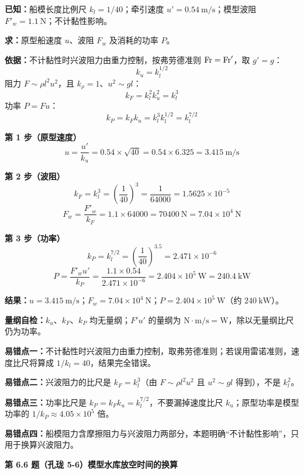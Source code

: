 \begin{jie}
\textbf{已知：}船模长度比例尺 $k_l=1/40$；牵引速度 $u'=0.54\ \mathrm{m/s}$；模型波阻 $F'_w=1.1\ \mathrm{N}$；不计黏性影响。

\textbf{求：}原型船速度 $u$、波阻 $F_w$ 及消耗的功率 $P$。

\textbf{依据：}不计黏性时兴波阻力由重力控制，按弗劳德准则 $\mathrm{Fr}=\mathrm{Fr}'$，取 $g'=g$：
\[k_u=k_l^{1/2}\]
阻力 $F\sim\rho l^{2}u^{2}$，且 $k_\rho=1$、$u^{2}\sim gl$：
\[k_F=k_l^{2}k_u^{2}=k_l^{3}\]
功率 $P=Fu$：
\[k_P=k_Fk_u=k_l^{3}k_l^{1/2}=k_l^{7/2}\]

\textbf{第 1 步（原型速度）}\quad
\[u=\frac{u'}{k_u}=0.54\times\sqrt{40}=0.54\times6.325=3.415\ \mathrm{m/s}\]

\textbf{第 2 步（波阻）}\quad
\[k_F=k_l^{3}=\left(\frac{1}{40}\right)^{3}=\frac{1}{64000}=1.5625\times10^{-5}\]
\[F_w=\frac{F'_w}{k_F}=1.1\times64000=70400\ \mathrm{N}=7.04\times10^{4}\ \mathrm{N}\]

\textbf{第 3 步（功率）}\quad
\[k_P=k_l^{7/2}=\left(\frac{1}{40}\right)^{3.5}=2.471\times10^{-6}\]
\[P=\frac{F'_wu'}{k_P}=\frac{1.1\times0.54}{2.471\times10^{-6}}=2.404\times10^{5}\ \mathrm{W}=240.4\ \mathrm{kW}\]

\textbf{结果：}$u=3.415\ \mathrm{m/s}$；$F_w=7.04\times10^{4}\ \mathrm{N}$；$P=2.404\times10^{5}\ \mathrm{W}$（约 $240\ \mathrm{kW}$）。

\textbf{量纲自检：}$k_u$、$k_F$、$k_P$ 均无量纲；$F'u'$ 的量纲为 $\mathrm{N\cdot m/s}=\mathrm{W}$，除以无量纲比尺仍为功率。
\end{jie}

\begin{yicuo}
\textbf{易错点一：}不计黏性时兴波阻力由重力控制，取弗劳德准则；若误用雷诺准则，速度比尺将算成 $1/k_l=40$，结果完全错误。

\textbf{易错点二：}兴波阻力的比尺是 $k_F=k_l^{3}$（由 $F\sim\rho l^{2}u^{2}$ 且 $u^{2}\sim gl$ 得到），不是 $k_l^{2}$。

\textbf{易错点三：}功率比尺是 $k_P=k_Fk_u=k_l^{7/2}$，不要漏掉速度比尺 $k_u$；原型功率是模型功率的 $1/k_P\approx4.05\times10^{5}$ 倍。

\textbf{易错点四：}船模阻力含摩擦阻力与兴波阻力两部分，本题明确“不计黏性影响”，只用于换算兴波阻力。
\end{yicuo}

\noindent\textbf{第 6.6 题（孔珑 5-6）\quad 模型水库放空时间的换算}

